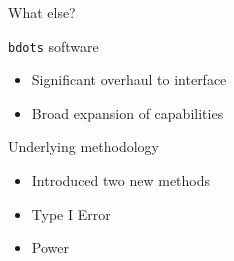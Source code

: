 \documentclass{beamer}
\newcommand{\xt}{\texttt}
\providecommand{\cn}[1]{\textcolor{blue}{#1}}
\begin{document}
%
%





\begin{frame}{What else?}

\xt{bdots} software
\begin{itemize}
\item Significant overhaul to interface
\item Broad expansion of capabilities
\end{itemize}
\vspace{4mm}

Underlying methodology
\begin{itemize}
\item Introduced two new methods
\item Type I Error
\item Power
\end{itemize}

\end{frame}
\end{document}

